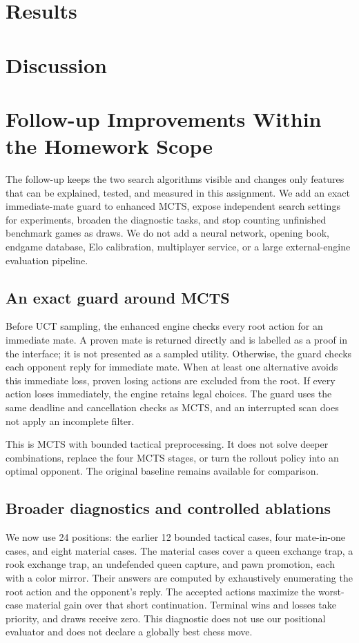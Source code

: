 \documentclass[oneside,final]{hcmut-report}
\begin{document}
\section{Results}
\label{sec:results}


\section{Discussion}


\section{Follow-up Improvements Within the Homework Scope}
The follow-up keeps the two search algorithms visible and changes only
features that can be explained, tested, and measured in this assignment.
We add an exact immediate-mate guard to enhanced MCTS, expose independent
search settings for experiments, broaden the diagnostic tasks, and stop
counting unfinished benchmark games as draws. We do not add a neural
network, opening book, endgame database, Elo calibration, multiplayer
service, or a large external-engine evaluation pipeline.

\subsection{An exact guard around MCTS}
Before UCT sampling, the enhanced engine checks every root action for an
immediate mate. A proven mate is returned directly and is labelled as a
proof in the interface; it is not presented as a sampled utility. Otherwise,
the guard checks each opponent reply for immediate mate. When at least one
alternative avoids this immediate loss, proven losing actions are excluded
from the root. If every action loses immediately, the engine retains legal
choices. The guard uses the same deadline and cancellation checks as MCTS,
and an interrupted scan does not apply an incomplete filter.

This is MCTS with bounded tactical preprocessing. It does not solve deeper
combinations, replace the four MCTS stages, or turn the rollout policy into
an optimal opponent. The original baseline remains available for comparison.

\subsection{Broader diagnostics and controlled ablations}
We now use 24 positions: the earlier 12 bounded tactical cases, four
mate-in-one cases, and eight material cases. The material cases cover a
queen exchange trap, a rook exchange trap, an undefended queen capture,
and pawn promotion, each with a color mirror. Their answers are computed
by exhaustively enumerating the root action and the opponent's reply.
The accepted actions maximize the worst-case material gain over that
short continuation. Terminal wins and losses take priority, and draws
receive zero. This diagnostic does not use our positional evaluator and
does not declare a globally best chess move.
\end{document}
